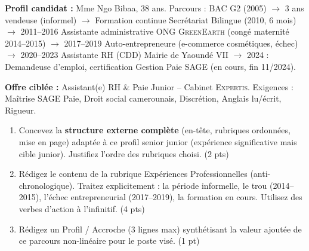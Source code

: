 \documentclass[11pt]{article}
\begin{document}
\begin{exercice}
\textbf{Profil candidat :} Mme Ngo Bibaa, 38 ans. Parcours : BAC G2 (2005) $\rightarrow$ 3 ans vendeuse (informel) $\rightarrow$ Formation continue \og Secrétariat Bilingue \fg{} (2010, 6 mois) $\rightarrow$ 2011--2016 Assistante administrative ONG \textsc{GreenEarth} (congé maternité 2014--2015) $\rightarrow$ 2017--2019 Auto-entrepreneure (e-commerce cosmétiques, échec) $\rightarrow$ 2020--2023 Assistante RH (CDD) Mairie de Yaoundé VII $\rightarrow$ 2024 : Demandeuse d'emploi, certification \og Gestion Paie SAGE \fg{} (en cours, fin 11/2024).

\textbf{Offre ciblée :} \og Assistant(e) RH \& Paie Junior \fg{} -- Cabinet \textsc{Expertis}. Exigences : Maîtrise SAGE Paie, Droit social camerounais, Discrétion, Anglais lu/écrit, Rigueur.

\begin{enumerate}
    \item Concevez la \textbf{structure externe complète} (en-tête, rubriques ordonnées, mise en page) adaptée à ce profil \og senior junior \fg{} (expérience significative mais cible junior). Justifiez l'ordre des rubriques choisi. (2 pts)
    \item Rédigez le contenu de la rubrique \og Expériences Professionnelles \fg{} (anti-chronologique). Traitez explicitement : la période informelle, le trou (2014--2015), l'échec entrepreneurial (2017--2019), la formation en cours. Utilisez des verbes d'action à l'infinitif. (4 pts)
    \item Rédigez un \og Profil / Accroche \fg{} (3 lignes max) synthétisant la valeur ajoutée de ce parcours non-linéaire pour le poste visé. (1 pt)
\end{enumerate}
\end{exercice}
\end{document}
